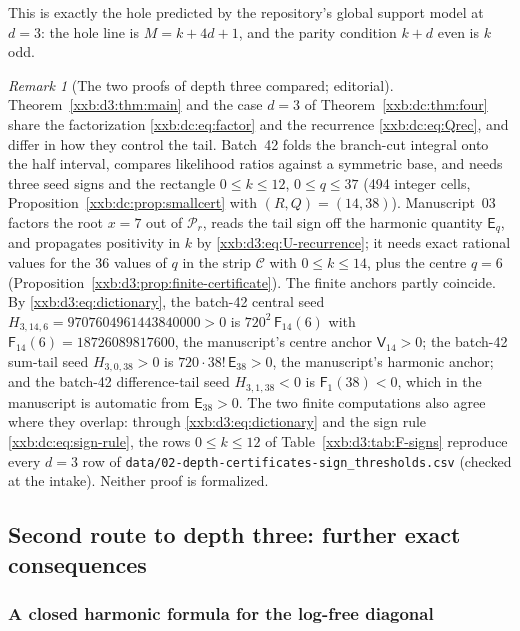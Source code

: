 \documentclass[11pt,a4paper]{article}
\numberwithin{equation}{section}
\theoremstyle{definition}
\theoremstyle{remark}
\newtheorem{remark}[theorem]{Remark}
\theoremstyle{plain}
\begin{document}
This is exactly the hole predicted by the repository's global support model at
$d=3$: the hole line is $M=k+4d+1$, and the parity condition $k+d$ even is
$k$ odd.

\begin{remark}[The two proofs of depth three compared; editorial]\label{xxb:d3:rem:compare}
Theorem~\ref{xxb:d3:thm:main} and the case $d=3$ of
Theorem~\ref{xxb:dc:thm:four} share the factorization
\eqref{xxb:dc:eq:factor} and the recurrence \eqref{xxb:dc:eq:Qrec}, and differ
in how they control the tail.  Batch~42 folds the branch-cut integral onto
the half interval, compares likelihood ratios against a symmetric base, and
needs three seed signs and the rectangle $0\le k\le12$, $0\le q\le37$ (494
integer cells, Proposition~\ref{xxb:dc:prop:smallcert} with $(R,Q)=(14,38)$).
Manuscript~03 factors the root $x=7$ out of $\mathcal P_r$, reads the tail
sign off the harmonic quantity $\mathsf E_q$, and propagates positivity in
$k$ by \eqref{xxb:d3:eq:U-recurrence}; it needs exact rational values for
the 36 values of $q$ in the strip $\mathcal C$ with $0\le k\le14$, plus the
centre $q=6$ (Proposition~\ref{xxb:d3:prop:finite-certificate}).
The finite anchors partly coincide.  By \eqref{xxb:d3:eq:dictionary}, the
batch-42 central seed $H_{3,14,6}=9707604961443840000>0$ is
$720^2\,\mathsf F_{14}(6)$ with $\mathsf F_{14}(6)=18726089817600$, the
manuscript's centre anchor $\mathsf V_{14}>0$; the batch-42 sum-tail seed
$H_{3,0,38}>0$ is $720\cdot38!\,\mathsf E_{38}>0$, the manuscript's harmonic
anchor; and the batch-42 difference-tail seed $H_{3,1,38}<0$ is
$\mathsf F_1(38)<0$, which in the manuscript is automatic from
$\mathsf E_{38}>0$.  The two finite computations also agree where they
overlap: through \eqref{xxb:d3:eq:dictionary} and the sign rule
\eqref{xxb:dc:eq:sign-rule}, the rows $0\le k\le12$ of
Table~\ref{xxb:d3:tab:F-signs} reproduce every $d=3$ row of
\texttt{data/02-depth-\allowbreak certificates-\allowbreak sign\_thresholds.csv}
(checked at the intake).  Neither proof is formalized.
\end{remark}

\subsection{Second route to depth three: further exact consequences}\label{xxb:d3:sec:consequences}

\subsubsection{A closed harmonic formula for the log-free diagonal}
\end{document}
